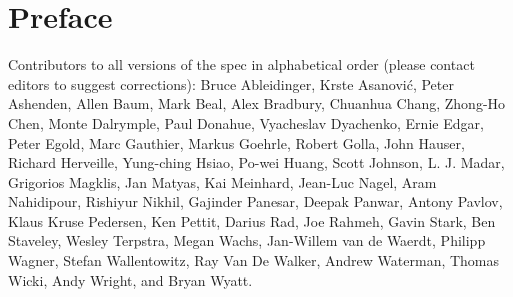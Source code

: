 \chapter{Preface}

Contributors to all versions of the spec in alphabetical order (please contact
editors to suggest corrections):
Bruce Ableidinger,
Krste Asanovi\'{c},
Peter Ashenden,
Allen Baum,
Mark Beal,
Alex Bradbury,
Chuanhua Chang,
Zhong-Ho Chen,
Monte Dalrymple,
Paul Donahue,
Vyacheslav Dyachenko,
Ernie Edgar,
Peter Egold,
Marc Gauthier,
Markus Goehrle,
Robert Golla,
John Hauser,
Richard Herveille,
Yung-ching Hsiao,
Po-wei Huang,
Scott Johnson,
L. J. Madar,
Grigorios Magklis,
Jan Matyas,
Kai Meinhard,
Jean-Luc Nagel,
Aram Nahidipour,
Rishiyur Nikhil,
Gajinder Panesar,
Deepak Panwar,
Antony Pavlov,
Klaus Kruse Pedersen,
Ken Pettit,
Darius Rad,
Joe Rahmeh,
Gavin Stark,
Ben Staveley,
Wesley Terpstra,
Megan Wachs,
Jan-Willem van de Waerdt,
Philipp Wagner,
Stefan Wallentowitz,
Ray Van De Walker,
Andrew Waterman,
Thomas Wicki,
Andy Wright,
and Bryan Wyatt.